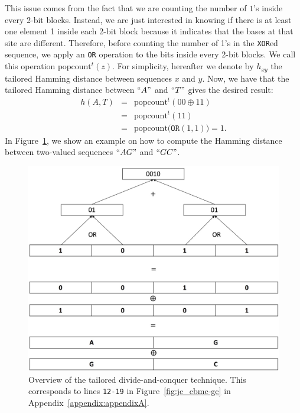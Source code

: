This issue comes from the fact that we are counting the number of $1$'s inside every 2-bit blocks. Instead, we are just interested in knowing if there is at least one element 1 inside each 2-bit block because it indicates that the bases at that site are different. Therefore, before counting the number of 1's in the \texttt{XOR}ed sequence, we apply an \texttt{OR} operation to the bits inside every 2-bit blocks. We call this operation $\text{popcount}^t(z)$. For simplicity, hereafter we denote by $h_{xy}$ the tailored Hamming distance between sequences $x$ and $y$. Now, we have that the tailored Hamming distance between $``A"$ and $``T"$ gives the desired result:
\begin{eqnarray*}
h(A, T) &=& \text{popcount}^t(00 \oplus 11)\\
&=& \text{popcount}^t(11) \\
&=& \text{popcount}\big(\texttt{OR}(1,1)\big) = 1.
\end{eqnarray*} In Figure~\ref{fig:hamming_divide}, we show an example on how to compute the Hamming distance between two-valued sequences $``AG"$ and $``GC"$.

\begin{figure}[h]
    \centering
    \includegraphics[scale=0.12]{Chapter_PrivatePhylogeneticTrees/divide-and-conquer-tailored.jpeg}
    \caption{Overview of the tailored divide-and-conquer technique. This corresponds to lines \texttt{12-19} in Figure~\ref{fig:jc_cbmc-gc} in Appendix~\ref{appendix:appendixA}.}
    \label{fig:hamming_divide}
\end{figure}


